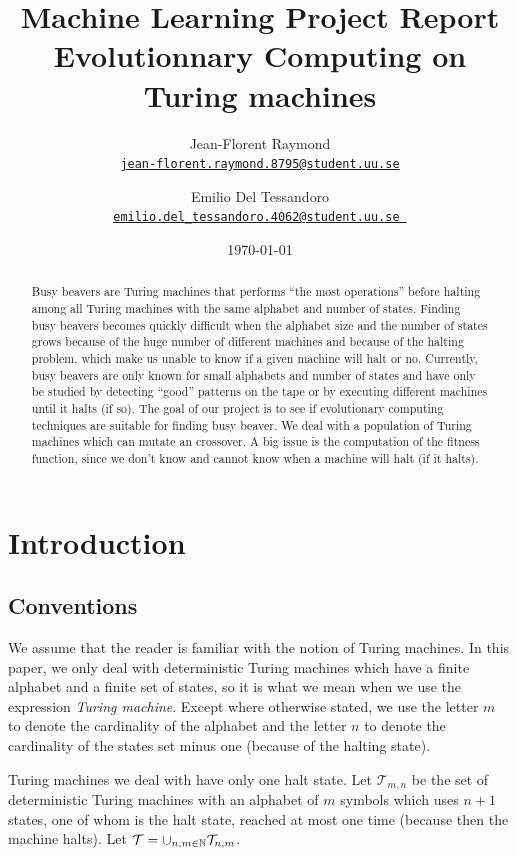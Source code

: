 \documentclass{report}
\title{Machine Learning Project Report\\\textbf{Evolutionnary Computing on\\Turing machines}}
\author{Jean-Florent Raymond\\\href{mailto:jean-florent.raymond.8795@student.uu.se}{\texttt{jean-florent.raymond.8795@student.uu.se}} \and Emilio Del Tessandoro\\
  \href{mailto:emilio.del_tessandoro.4062@student.uu.se }{\texttt{emilio.del\_tessandoro.4062@student.uu.se }}}
\date{\today}
\begin{document}
\maketitle

\begin{abstract}
  Busy beavers are Turing machines that performs ``the most operations'' before halting among all Turing machines with the same alphabet and number of states. Finding busy beavers becomes quickly difficult when the alphabet size and the number of states grows because of the huge number of different machines and because of the halting problem, which make us unable to know if a given machine will halt or no. Currently, busy beavers are only known for small alphabets and number of states and have only be studied by detecting ``good'' patterns on the tape or by executing different machines until it halts (if so).
  The goal of our project is to see if evolutionary computing techniques are suitable for finding busy beaver. We deal with a population of Turing machines which can mutate an crossover. A big issue is the computation of the fitness function, since we don't know and cannot know when a machine will halt (if it halts).
\end{abstract}

\chapter{Introduction}
\label{chap:intro}

\section{Conventions}

We assume that the reader is familiar with the notion of Turing machines. In this paper, we only deal with deterministic Turing machines which have a finite alphabet and a finite set of states, so it is what we mean when we use the expression \emph{Turing machine}. Except where otherwise stated, we use the letter $m$ to denote the cardinality of the alphabet and the letter $n$ to denote the cardinality of the states set minus one (because of the halting state).

Turing machines we deal with have only one halt state. Let $\mathcal{T}_{m,n}$ be the set of deterministic Turing machines with an alphabet of $m$ symbols which uses $n + 1$ states, one of whom is the halt state, reached at most one time (because then the machine halts). Let  $\mathcal{T} = \cup_{n,m \in \mathbb{N}} \mathcal{T}_{n,m}$.
\end{document}
